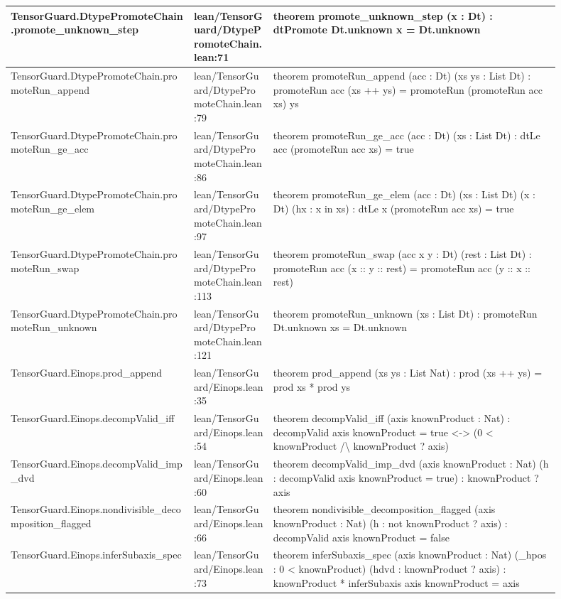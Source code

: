 \documentclass[10pt]{article}
\begin{document}
\begin{longtable}{|p{0.30\linewidth}|p{0.13\linewidth}|p{0.47\linewidth}|}
\hline
TensorGuard.DtypePromoteChain.promote\_unknown\_step & lean/TensorGuard/DtypePromoteChain.lean:71 & theorem promote\_unknown\_step (x : Dt) : dtPromote Dt.unknown x = Dt.unknown \\
\hline
TensorGuard.DtypePromoteChain.promoteRun\_append & lean/TensorGuard/DtypePromoteChain.lean:79 & theorem promoteRun\_append (acc : Dt) (xs ys : List Dt) : promoteRun acc (xs ++ ys) = promoteRun (promoteRun acc xs) ys \\
\hline
TensorGuard.DtypePromoteChain.promoteRun\_ge\_acc & lean/TensorGuard/DtypePromoteChain.lean:86 & theorem promoteRun\_ge\_acc (acc : Dt) (xs : List Dt) : dtLe acc (promoteRun acc xs) = true \\
\hline
TensorGuard.DtypePromoteChain.promoteRun\_ge\_elem & lean/TensorGuard/DtypePromoteChain.lean:97 & theorem promoteRun\_ge\_elem (acc : Dt) (xs : List Dt) (x : Dt) (hx : x in xs) : dtLe x (promoteRun acc xs) = true \\
\hline
TensorGuard.DtypePromoteChain.promoteRun\_swap & lean/TensorGuard/DtypePromoteChain.lean:113 & theorem promoteRun\_swap (acc x y : Dt) (rest : List Dt) : promoteRun acc (x :: y :: rest) = promoteRun acc (y :: x :: rest) \\
\hline
TensorGuard.DtypePromoteChain.promoteRun\_unknown & lean/TensorGuard/DtypePromoteChain.lean:121 & theorem promoteRun\_unknown (xs : List Dt) : promoteRun Dt.unknown xs = Dt.unknown \\
\hline
TensorGuard.Einops.prod\_append & lean/TensorGuard/Einops.lean:35 & theorem prod\_append (xs ys : List Nat) : prod (xs ++ ys) = prod xs * prod ys \\
\hline
TensorGuard.Einops.decompValid\_iff & lean/TensorGuard/Einops.lean:54 & theorem decompValid\_iff (axis knownProduct : Nat) : decompValid axis knownProduct = true <-> (0 < knownProduct /\textbackslash{} knownProduct ? axis) \\
\hline
TensorGuard.Einops.decompValid\_imp\_dvd & lean/TensorGuard/Einops.lean:60 & theorem decompValid\_imp\_dvd (axis knownProduct : Nat) (h : decompValid axis knownProduct = true) : knownProduct ? axis \\
\hline
TensorGuard.Einops.nondivisible\_decomposition\_flagged & lean/TensorGuard/Einops.lean:66 & theorem nondivisible\_decomposition\_flagged (axis knownProduct : Nat) (h : not  knownProduct ? axis) : decompValid axis knownProduct = false \\
\hline
TensorGuard.Einops.inferSubaxis\_spec & lean/TensorGuard/Einops.lean:73 & theorem inferSubaxis\_spec (axis knownProduct : Nat) (\_hpos : 0 < knownProduct) (hdvd : knownProduct ? axis) : knownProduct * inferSubaxis axis knownProduct = axis \\

\end{longtable}
\end{document}
